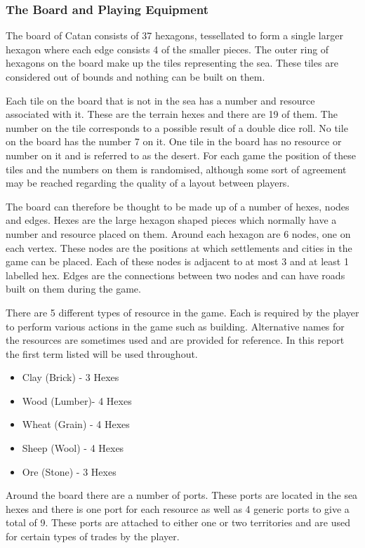 \documentclass[]{article}
\begin{document}
\subsubsection{The Board and Playing Equipment}
The board of Catan consists of 37 hexagons, tessellated to form a single larger hexagon where each edge consists 4 of the smaller pieces. The outer ring of hexagons on the board make up the tiles representing the sea. These tiles are considered out of bounds and nothing can be built on them.

\par Each tile on the board that is not in the sea has a number and resource associated with it. These are the terrain hexes and there are 19 of them. The number on the tile corresponds to a possible result of a double dice roll. No tile on the board has the number 7 on it. One tile in the board has no resource or number on it and is referred to as the desert. For each game the position of these tiles and the numbers on them is randomised, although some sort of agreement may be reached regarding the quality of a layout between players.

\par The board can therefore be thought to be made up of a number of hexes, nodes and edges. Hexes are the large hexagon shaped pieces which normally have a number and resource placed on them. Around each hexagon are 6 nodes, one on each vertex. These nodes are the positions at which settlements and cities in the game can be placed. Each of these nodes is adjacent to at most 3 and at least 1 labelled hex. Edges are the connections between two nodes and can have roads built on them during the game.

\par There are 5 different types of resource in the game. Each is required by the player to perform various actions in the game such as building. Alternative names for the resources are sometimes used and are provided for reference. In this report the first term listed will be used throughout.
\begin{itemize}
  \item Clay (Brick) - 3 Hexes
  \item Wood (Lumber)- 4 Hexes
  \item Wheat (Grain) - 4 Hexes
  \item Sheep (Wool) - 4 Hexes 
  \item Ore (Stone) - 3 Hexes
\end{itemize}

\par Around the board there are a number of ports. These ports are located in the sea hexes and there is one port for each resource as well as 4 generic ports to give a total of 9. These ports are attached to either one or two territories and are used for certain types of trades by the player.
\end{document}
